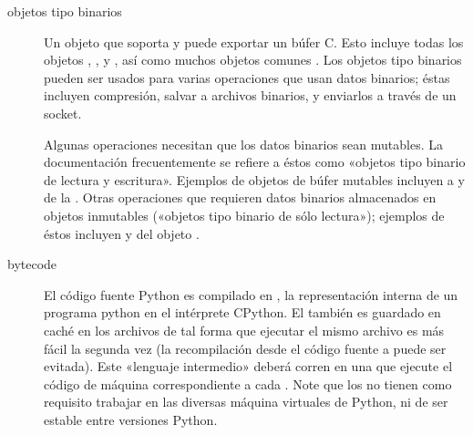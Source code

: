 \documentclass[a4,10pt,spanish]{sphinxmanual}
\begin{document}
\begin{description}
\item[{objetos tipo binarios\label{\detokenize{glossary:term-bytes-like-object}}}] \leavevmode
\sphinxAtStartPar
Un objeto que soporta   y puede exportar un búfer C. Esto incluye todas los objetos , , y , así como muchos objetos comunes . Los objetos tipo binarios pueden ser usados para varias operaciones que usan datos binarios; éstas incluyen compresión, salvar a archivos binarios, y enviarlos a través de un socket.

\sphinxAtStartPar
Algunas operaciones necesitan que los datos binarios sean mutables. La documentación frecuentemente se refiere a éstos como «objetos tipo binario de lectura y escritura». Ejemplos de objetos de búfer mutables incluyen a  y  de la . Otras operaciones que requieren datos binarios almacenados en objetos inmutables («objetos tipo binario de sólo lectura»); ejemplos de éstos incluyen  y  del objeto .

\item[{bytecode\label{\detokenize{glossary:term-bytecode}}}] \leavevmode
\sphinxAtStartPar
El código fuente Python es compilado en , la representación interna de un programa python en el intérprete CPython. El  también es guardado en caché en los archivos  de tal forma que ejecutar el mismo archivo es más fácil la segunda vez (la recompilación desde el código fuente a  puede ser evitada). Este «lenguaje intermedio» deberá corren en una {\hyperref[\detokenize{glossary:term-virtual-machine}]{}} que ejecute el código de máquina correspondiente a cada . Note que los  no tienen como requisito trabajar en las diversas máquina virtuales de Python, ni de ser estable entre versiones Python.


\end{description}
\end{document}
